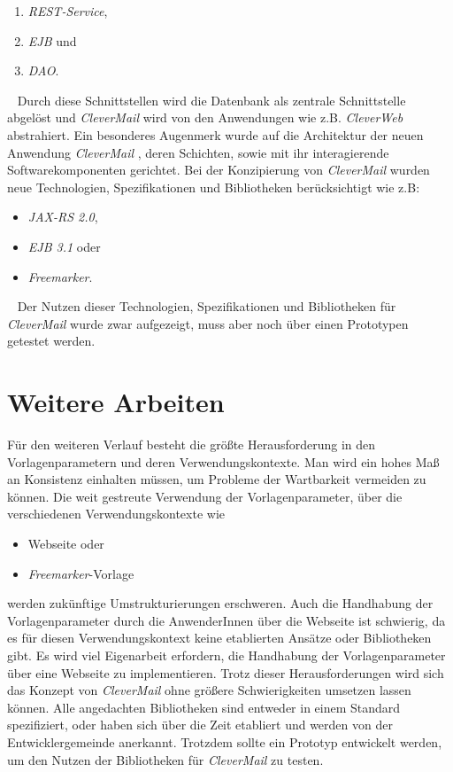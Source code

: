 \begin{enumerate}
	\item \emph{REST-Service},
	\item \emph{EJB} und
	\item \emph{DAO}.
\end{enumerate}
\ \newline
Durch diese Schnittstellen wird die Datenbank als zentrale Schnittstelle abgelöst und \emph{CleverMail} wird von den Anwendungen wie z.B. \emph{CleverWeb} abstrahiert. Ein besonderes Augenmerk wurde auf die Architektur der neuen Anwendung \emph{CleverMail} , deren Schichten, sowie mit ihr interagierende Softwarekomponenten gerichtet. Bei der Konzipierung von \emph{CleverMail} wurden neue Technologien, Spezifikationen und Bibliotheken berücksichtigt wie z.B:
\begin{itemize}
	\item \emph{JAX-RS 2.0},
	\item \emph{EJB 3.1} oder
	\item \emph{Freemarker}.
\end{itemize}
\ \newline
Der Nutzen dieser Technologien, Spezifikationen und Bibliotheken für \emph{CleverMail} wurde zwar aufgezeigt, muss aber noch über einen Prototypen getestet werden.

\section{Weitere Arbeiten}
Für den weiteren Verlauf besteht die größte Herausforderung in den Vorlagenparametern und deren Verwendungskontexte. Man wird ein hohes Maß an Konsistenz einhalten müssen, um Probleme der Wartbarkeit vermeiden zu können. Die weit gestreute Verwendung der Vorlagenparameter, über die verschiedenen Verwendungskontexte wie
\begin{itemize}
	\item Webseite oder
	\item \emph{Freemarker}-Vorlage
\end{itemize} 
werden zukünftige Umstrukturierungen erschweren. Auch die Handhabung der Vorlagenparameter durch die AnwenderInnen über die Webseite ist schwierig, da es für diesen Verwendungskontext keine etablierten Ansätze oder Bibliotheken gibt. Es wird viel Eigenarbeit erfordern, die Handhabung der Vorlagenparameter über eine Webseite zu implementieren. Trotz dieser Herausforderungen wird sich das Konzept von \emph{CleverMail} ohne größere Schwierigkeiten umsetzen lassen können. Alle angedachten Bibliotheken sind entweder in einem Standard spezifiziert, oder haben sich über die Zeit etabliert und werden von der Entwicklergemeinde anerkannt. Trotzdem sollte ein Prototyp entwickelt werden, um den Nutzen der Bibliotheken für \emph{CleverMail} zu testen.

